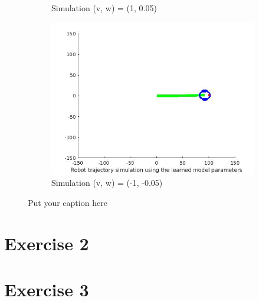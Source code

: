 \documentclass{article}
\begin{document}
\begin{figure}[ht]
\begin{subfigure}{.5\textwidth}
		\caption{Simulation (v, w) = (1, 0.05)}
		\label{fig:sub-first}
	\end{subfigure}
	\begin{subfigure}{.5\textwidth}
		\centering
		\includegraphics[width=.8\linewidth]{2.jpg}  
		\caption{Simulation (v, w) = (-1, -0.05)}
		\label{fig:sub-second}
	\end{subfigure}
	\caption{Put your caption here}
	\label{fig:fig}
\end{figure}
\newpage
\section*{Exercise 2}


\section*{Exercise 3}
\end{document}
